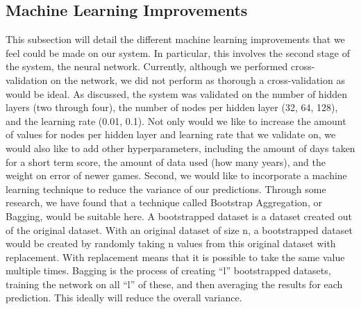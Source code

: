 \subsection{Machine Learning Improvements}
This subsection will detail the different machine learning improvements that we feel could be made on our system. In particular, this involves the second stage of the system, the neural network. Currently, although we performed cross-validation on the network, we did not perform as thorough a cross-validation as would be ideal. As discussed, the system was validated on the number of hidden layers (two through four), the number of nodes per hidden layer (32, 64, 128), and the learning rate (0.01, 0.1). Not only would we like to increase the amount of values for nodes per hidden layer and learning rate that we validate on, we would also like to add other hyperparameters, including the amount of days taken for a short term score, the amount of data used (how many years), and the weight on error of newer games. %
Second, we would like to incorporate a machine learning technique to reduce the variance of our predictions. Through some research, we have found that a technique called Bootstrap Aggregation, or Bagging, would be suitable here. %
A bootstrapped dataset is a dataset created out of the original dataset. With an original dataset of size n, a bootstrapped dataset would be created by randomly taking n values from this original dataset with replacement. With replacement means that it is possible to take the same value multiple times. Bagging is the process of creating ``l'' bootstrapped datasets, training the network on all ``l'' of these, and then averaging the results for each prediction. This ideally will reduce the overall variance. 
